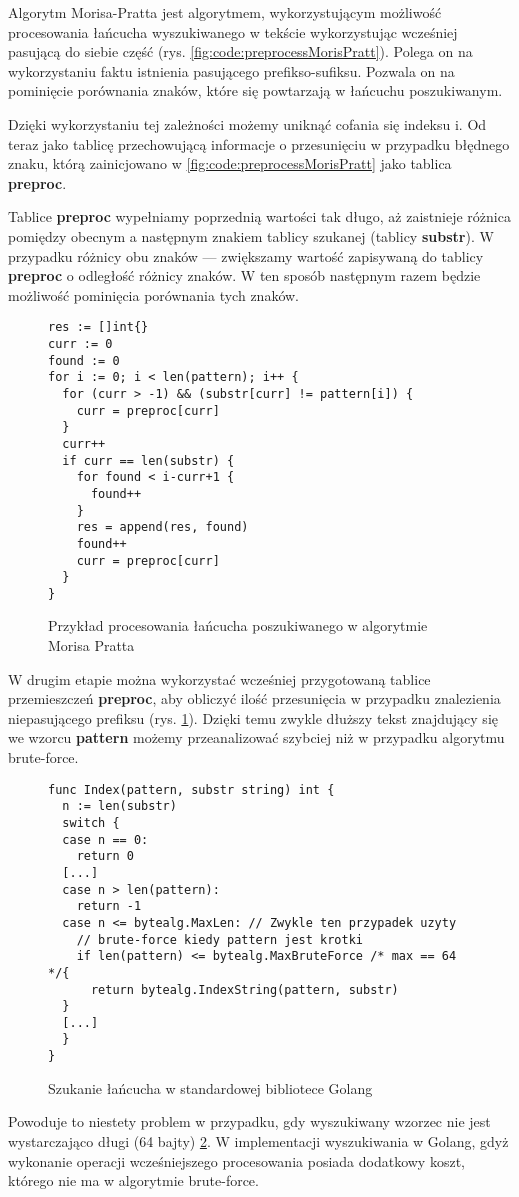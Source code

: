 Algorytm Morisa-Pratta jest algorytmem, wykorzystującym możliwość procesowania 
łańcucha wyszukiwanego w tekście wykorzystując wcześniej pasującą do siebie część
(rys. \ref{fig:code:preprocessMorisPratt}). Polega on na wykorzystaniu faktu
 istnienia pasującego prefikso-sufiksu. Pozwala on na pominięcie porównania
 znaków, które się powtarzają w łańcuchu poszukiwanym.

Dzięki wykorzystaniu tej zależności możemy uniknąć cofania się indeksu i. 
Od teraz jako tablicę przechowującą informacje o przesunięciu w przypadku 
błędnego znaku, którą zainicjowano w \ref{fig:code:preprocessMorisPratt}
jako tablica \textbf{preproc}.

Tablice \textbf{preproc} wypełniamy poprzednią wartości tak długo, aż zaistnieje
różnica pomiędzy obecnym a następnym znakiem tablicy szukanej (tablicy 
\textbf{substr}). W przypadku różnicy obu znaków — zwiększamy wartość zapisywaną 
do tablicy \textbf{preproc} o odległość różnicy znaków. W ten sposób następnym
 razem będzie możliwość pominięcia porównania tych znaków.

\begin{figure}[h]
  \centering
  \begin{lstlisting}
res := []int{}
curr := 0
found := 0
for i := 0; i < len(pattern); i++ {
  for (curr > -1) && (substr[curr] != pattern[i]) {
    curr = preproc[curr]
  }
  curr++
  if curr == len(substr) {
    for found < i-curr+1 {
      found++
    }
    res = append(res, found)
    found++
    curr = preproc[curr]
  }
}
  \end{lstlisting}
  \caption{Przykład procesowania łańcucha poszukiwanego w algorytmie Morisa Pratta}
  \label{fig:code:algoMorisPratt}
\end{figure}

W drugim etapie można wykorzystać wcześniej przygotowaną tablice przemieszczeń 
\textbf{preproc}, aby obliczyć ilość przesunięcia w przypadku znalezienia 
niepasującego prefiksu (rys. \ref{fig:code:algoMorisPratt}). Dzięki temu zwykle 
dłuższy tekst znajdujący się we wzorcu \textbf{pattern} możemy przeanalizować szybciej
niż w przypadku algorytmu brute-force.

\begin{figure}[h]
    \centering
\begin{lstlisting}
func Index(pattern, substr string) int {
  n := len(substr)
  switch {
  case n == 0:
    return 0
  [...]
  case n > len(pattern):
    return -1
  case n <= bytealg.MaxLen: // Zwykle ten przypadek uzyty
    // brute-force kiedy pattern jest krotki
    if len(pattern) <= bytealg.MaxBruteForce /* max == 64 */{
      return bytealg.IndexString(pattern, substr)
  }
  [...]
  }
}
\end{lstlisting}
\caption{Szukanie łańcucha w standardowej bibliotece Golang}
\label{fig:code:golangSearchInsideString}
\end{figure}
Powoduje to niestety problem w przypadku,
gdy wyszukiwany wzorzec nie jest wystarczająco długi (64 bajty) \ref{fig:code:golangSearchInsideString}. W implementacji 
wyszukiwania w Golang, gdyż wykonanie operacji wcześniejszego procesowania 
posiada dodatkowy koszt, którego nie ma w algorytmie brute-force.

